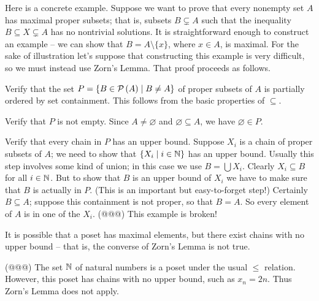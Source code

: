Here is a concrete example. Suppose we want to prove that every nonempty set \(A\) has maximal proper subsets; that is, subsets \(B \subsetneq A\) such that the inequality \(B \subseteq X \subsetneq A\) has no nontrivial solutions. It is straightforward enough to construct an example -- we can show that \(B = A \setminus \{x\}\), where \(x \in A\), is maximal. For the sake of illustration let's suppose that constructing this example is very difficult, so we must instead use Zorn's Lemma. That proof proceeds as follows.
\begin{proplist}
\item Verify that the set \(P = \{ B \in \mathcal{P}\left(A\right) \mid B \neq A \}\) of proper subsets of \(A\) is partially ordered by set containment. This follows from the basic properties of \(\subseteq\).
\item Verify that \(P\) is not empty. Since \(A \neq \varnothing\) and \(\varnothing \subseteq A\), we have \(\varnothing \in P\).
\item Verify that every chain in \(P\) has an upper bound. Suppose \(X_i\) is a chain of proper subsets of \(A\); we need to show that \(\{ X_i \mid i \in \mathbb{N} \}\) has an upper bound. Usually this step involves some kind of union; in this case we use \(B = \bigcup X_i\). Clearly \(X_i \subseteq B\) for all \(i \in \mathbb{N}\). But to show that \(B\) is an upper bound of \(X_i\) we have to make sure that \(B\) is actually in \(P\). (This is an important but easy-to-forget step!) Certainly \(B \subseteq A\); suppose this containment is not proper, so that \(B = A\). So every element of \(A\) is in one of the \(X_i\). (@@@) This example is broken!
\end{proplist}

It is possible that a poset has maximal elements, but there exist chains with no upper bound -- that is, the converse of Zorn's Lemma is not true.



\Exercises%

\begin{exercise}
(@@@) The set \(\mathbb{N}\) of natural numbers is a poset under the usual \(\leq\) relation. However, this poset has chains with no upper bound, such as \(x_n = 2n\). Thus Zorn's Lemma does not apply.
\end{exercise}
